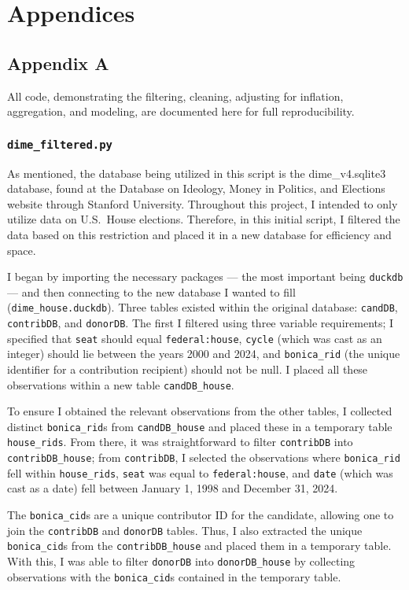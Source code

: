 \section*{Appendices}

\subsection*{Appendix A}

All code, demonstrating the filtering, cleaning, adjusting for inflation, aggregation, and modeling, are documented here for full reproducibility.

\subsubsection*{\tt dime\_filtered.py}

As mentioned, the database being utilized in this script is the dime\_v4.sqlite3 database, found at the Database on Ideology, Money in Politics, and Elections website through Stanford University. Throughout this project, I intended to only utilize data on U.S.\ House elections. Therefore, in this initial script, I filtered the data based on this restriction and placed it in a new database for efficiency and space.

I began by importing the necessary packages --- the most important being {\tt duckdb} --- and then connecting to the new database I wanted to fill ({\tt dime\_house.duckdb}). Three tables existed within the original database: {\tt candDB}, {\tt contribDB}, and {\tt donorDB}. The first I filtered using three variable requirements; I specified that {\tt seat} should equal {\tt federal:house}, {\tt cycle} (which was cast as an integer) should lie between the years 2000 and 2024, and {\tt bonica\_rid} (the unique identifier for a contribution recipient) should not be null. I placed all these observations within a new table {\tt candDB\_house}.

To ensure I obtained the relevant observations from the other tables, I collected distinct {\tt bonica\_rid}s from {\tt candDB\_house} and placed these in a temporary table {\tt house\_rids}. From there, it was straightforward to filter {\tt contribDB} into {\tt contribDB\_house}; from {\tt contribDB}, I selected the observations where {\tt bonica\_rid} fell within {\tt house\_rids}, {\tt seat} was equal to {\tt federal:house}, and {\tt date} (which was cast as a date) fell between January 1, 1998 and December 31, 2024.

The {\tt bonica\_cid}s are a unique contributor ID for the candidate, allowing one to join the {\tt contribDB} and {\tt donorDB} tables. Thus, I also extracted the unique {\tt bonica\_cid}s from the {\tt contribDB\_house} and placed them in a temporary table. With this, I was able to filter {\tt donorDB} into {\tt donorDB\_house} by collecting observations with the {\tt bonica\_cid}s contained in the temporary table. 

